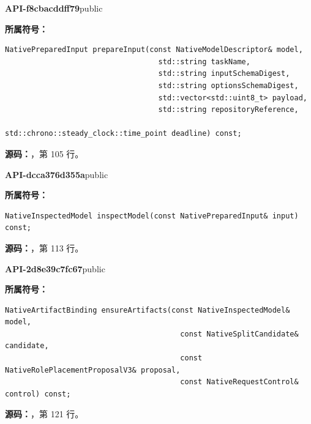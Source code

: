 \textbf{API-f8cbacddff79}\quad public\par
\textbf{所属符号：}\par
\begin{Verbatim}[fontsize=\footnotesize,breaklines,breakanywhere]
NativePreparedInput prepareInput(const NativeModelDescriptor& model,
                                   std::string taskName,
                                   std::string inputSchemaDigest,
                                   std::string optionsSchemaDigest,
                                   std::vector<std::uint8_t> payload,
                                   std::string repositoryReference,
                                   std::chrono::steady_clock::time_point deadline) const;
\end{Verbatim}
\textbf{源码：}，第 105 行。\par

\textbf{API-dcca376d355a}\quad public\par
\textbf{所属符号：}\par
\begin{Verbatim}[fontsize=\footnotesize,breaklines,breakanywhere]
NativeInspectedModel inspectModel(const NativePreparedInput& input) const;
\end{Verbatim}
\textbf{源码：}，第 113 行。\par

\textbf{API-2d8e39c7fc67}\quad public\par
\textbf{所属符号：}\par
\begin{Verbatim}[fontsize=\footnotesize,breaklines,breakanywhere]
NativeArtifactBinding ensureArtifacts(const NativeInspectedModel& model,
                                        const NativeSplitCandidate& candidate,
                                        const NativeRolePlacementProposalV3& proposal,
                                        const NativeRequestControl& control) const;
\end{Verbatim}
\textbf{源码：}，第 121 行。\par

